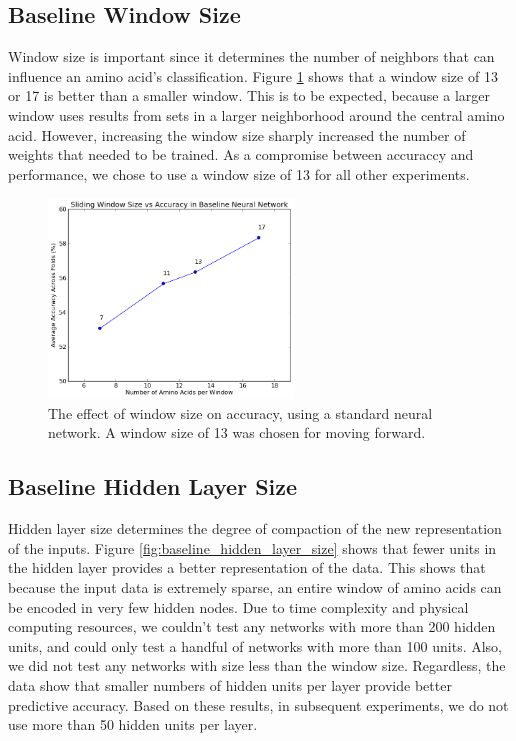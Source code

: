 \documentclass[letterpaper,twocolumn,12pt]{article}
\begin{document}
\subsection{Baseline Window Size}
Window size is important since it determines the number of neighbors that can influence an amino acid's classification.
Figure \ref{fig:baseline_window_size} shows that a window size of 13 or 17 is better than a smaller window.
This is to be expected, because a larger window uses results from sets in a larger neighborhood around the central amino acid.
However, increasing the window size sharply increased the number of weights that needed to be trained.
As a compromise between accuraccy and performance, we chose to use a window size of 13 for all other experiments.

\begin{figure}[ht!]
\centering
\includegraphics[width=65mm]{results/baseline/baseline_windowSize.png}
\caption{The effect of window size on accuracy, using a standard neural network. A window size of 13 was chosen for moving forward.}
\label{fig:baseline_window_size}
\end{figure}

\subsection{Baseline Hidden Layer Size}
Hidden layer size determines the degree of compaction of the new representation of the inputs.
Figure \ref{fig:baseline_hidden_layer_size} shows that fewer units in the hidden layer provides a better representation of the data.
This shows that because the input data is extremely sparse, an entire window of amino acids can be encoded in very few hidden nodes.
Due to time complexity and physical computing resources, we couldn't test any networks with more than 200 hidden units, and could only test a handful of networks with more than 100 units.
Also, we did not test any networks with size less than the window size.
Regardless, the data show that smaller numbers of hidden units per layer provide better predictive accuracy.
Based on these results, in subsequent experiments, we do not use more than 50 hidden units per layer.
\end{document}
